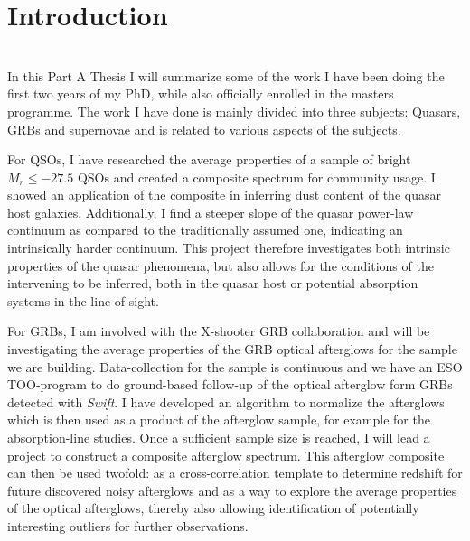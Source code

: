 %
\chapter{Introduction}
\label{sec:intro}

 \\

In this Part A Thesis I will summarize some of the work I have been doing the first two years of my PhD, while also officially enrolled in the masters programme. The work I have done is mainly divided into three subjects: Quasars, GRBs and supernovae and is related to various aspects of the subjects. 

For QSOs, I have researched the average properties of a sample of bright $M_{r} \leq -27.5$ QSOs and created a composite spectrum for community usage. I showed an application of the composite in inferring dust content of the quasar host galaxies. Additionally, I find a steeper slope of the quasar power-law continuum as compared to the traditionally assumed one, indicating an intrinsically harder continuum. This project therefore investigates both intrinsic properties of the quasar phenomena, but also allows for the conditions of the intervening to be inferred, both in the quasar host or potential absorption systems in the line-of-sight.

For GRBs, I am involved with the X-shooter GRB collaboration and will be investigating the average properties of the GRB optical afterglows for the sample we are building. Data-collection for the sample is continuous and we have an ESO TOO-program to do ground-based follow-up of the optical afterglow form GRBs detected with \textit{Swift}.  I have developed an algorithm to normalize the afterglows which is then used  as a product of the afterglow sample, for example for the absorption-line studies. Once a sufficient sample size is reached, I will lead a project to construct a composite afterglow spectrum. This afterglow composite can then be used twofold: as a cross-correlation template to determine redshift for future discovered noisy afterglows and as a way to explore the average properties of the optical afterglows, thereby also allowing identification of potentially interesting outliers for further observations. 

